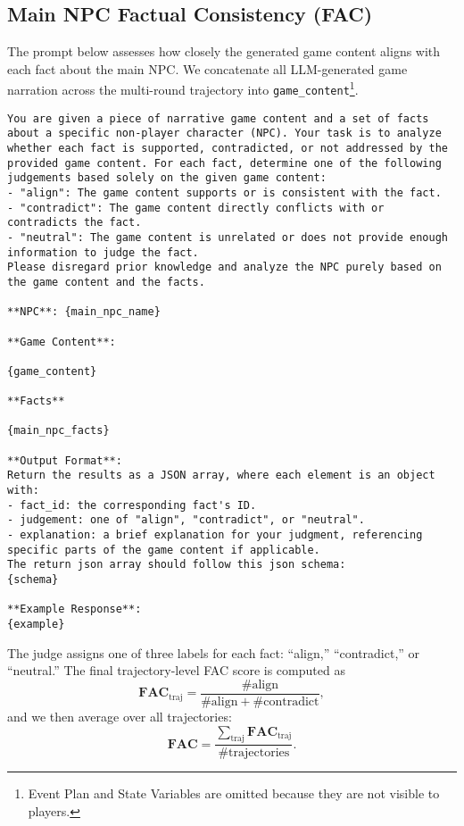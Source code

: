 \subsection{Main NPC Factual Consistency (FAC)}
The prompt below assesses how closely the generated game content aligns with each fact about the main NPC. We concatenate all LLM-generated game narration across the multi-round trajectory into \texttt{game\_content}\footnote{Event Plan and State Variables are omitted because they are not visible to players.}.
\begin{center}
\begin{minipage}{0.95\textwidth}
\begin{lstlisting}[language=plaintext, frame=none, numbers=none]
You are given a piece of narrative game content and a set of facts about a specific non-player character (NPC). Your task is to analyze whether each fact is supported, contradicted, or not addressed by the provided game content. For each fact, determine one of the following judgements based solely on the given game content:
- "align": The game content supports or is consistent with the fact.
- "contradict": The game content directly conflicts with or contradicts the fact.
- "neutral": The game content is unrelated or does not provide enough information to judge the fact.
Please disregard prior knowledge and analyze the NPC purely based on the game content and the facts.

**NPC**: {main_npc_name}

**Game Content**:

{game_content}

**Facts**

{main_npc_facts}

**Output Format**:  
Return the results as a JSON array, where each element is an object with:
- fact_id: the corresponding fact's ID.
- judgement: one of "align", "contradict", or "neutral".
- explanation: a brief explanation for your judgment, referencing specific parts of the game content if applicable.
The return json array should follow this json schema:
{schema}

**Example Response**:
{example}
\end{lstlisting}
\end{minipage}
\end{center}
The judge assigns one of three labels for each fact: ``align,'' ``contradict,'' or ``neutral.'' The final trajectory-level FAC score is computed as
\begin{equation}
    \textbf{FAC}_\text{traj} = \frac{\# \text{align}}{\# \text{align} + \# \text{contradict}},
\end{equation}
and we then average over all trajectories:
\begin{equation}
    \textbf{FAC} = \frac{\sum_{\text{traj}} \textbf{FAC}_\text{traj}}{\# \text{trajectories}}.
\end{equation}

